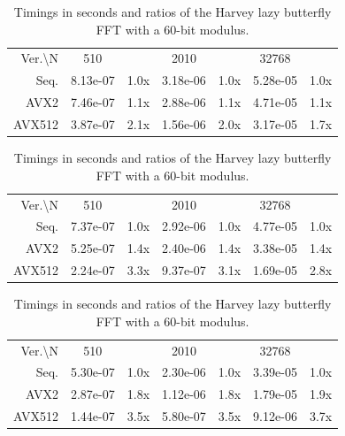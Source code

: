 \documentclass[a4paper]{article}
\begin{document}
\begin{table}[h!]
    \centering
    
    \begin{tabular}{|r|*{3}{c c|}}
        \hline
        \rowcolor{myGray} 
        \multicolumn{7}{|c|}{\textsc{Cascade Lake}} \\

        \hline
        \rowcolor{myGray}
        Ver.\textbackslash N & 510 & & 2010 & & 32768 & \\
        \hline
        \cellcolor{myGray} Seq. & 8.13e-07 & 1.0x & 3.18e-06 & 1.0x & 5.28e-05 & 1.0x \\
        \hline
        \cellcolor{myGray} AVX2 & 7.46e-07 & 1.1x & 2.88e-06 & 1.1x & 4.71e-05 & 1.1x \\
        \hline
        \cellcolor{myGray} AVX512 & 3.87e-07 & 2.1x & 1.56e-06 & 2.0x & 3.17e-05 & 1.7x \\
        \hline
    \end{tabular}

    \begin{tabular}{|r|*{3}{c c|}}
        \hline
        \rowcolor{myGray} 
        \multicolumn{7}{|c|}{\textsc{Ice Lake}} \\

        \hline
        \rowcolor{myGray}
        Ver.\textbackslash N & 510 & & 2010 & & 32768 & \\
        \hline
        \cellcolor{myGray} Seq. & 7.37e-07 & 1.0x & 2.92e-06 & 1.0x & 4.77e-05 & 1.0x \\
        \hline
        \cellcolor{myGray} AVX2 & 5.25e-07 & 1.4x & 2.40e-06 & 1.4x & 3.38e-05 & 1.4x \\
        \hline
        \cellcolor{myGray} AVX512 & 2.24e-07 & 3.3x & 9.37e-07 & 3.1x & 1.69e-05 & 2.8x \\
        \hline
    \end{tabular}

    \begin{tabular}{|r|*{3}{c c|}}
        \hline
        \rowcolor{myGray}
        \multicolumn{7}{|c|}{\textsc{Zen 4}} \\

        \hline
        \rowcolor{myGray}
        Ver.\textbackslash N & 510 & & 2010 & & 32768 & \\
        \hline
        \cellcolor{myGray} Seq. & 5.30e-07 & 1.0x & 2.30e-06 & 1.0x & 3.39e-05 & 1.0x \\
        \hline
        \cellcolor{myGray} AVX2 & 2.87e-07 & 1.8x & 1.12e-06 & 1.8x & 1.79e-05 & 1.9x \\
        \hline
        \cellcolor{myGray} AVX512 & 1.44e-07 & 3.5x & 5.80e-07 & 3.5x & 9.12e-06 & 3.7x \\
        \hline
    \end{tabular}
    \caption{Timings in seconds and ratios of the Harvey lazy butterfly FFT with a 60-bit modulus.}
\end{table}
\end{document}
